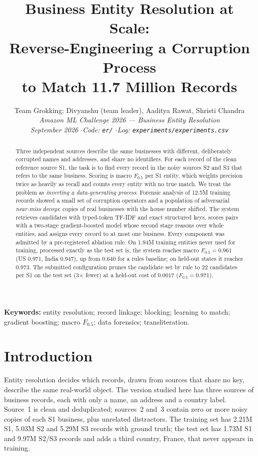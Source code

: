 \documentclass[10pt]{article}
\title{\textbf{Business Entity Resolution at Scale:\\ Reverse-Engineering a Corruption Process\\ to Match 11.7 Million Records}}
\author{Team Grokking: Divyanshu (team leader), Aaditya Rawat, Shristi Chandra\\[2pt]
\small\itshape Amazon ML Challenge 2026 --- Business Entity Resolution\\
\small September 2026 \quad$\cdot$\quad Code: \texttt{er/} \quad$\cdot$\quad Log: \texttt{experiments/experiments.csv}}
\date{}
\newcommand{\Fh}{F_{0.5}}
\begin{document}
\maketitle

\begin{abstract}
\noindent Three independent sources describe the same businesses with different, deliberately corrupted names and addresses, and share no identifiers. For each record of the clean reference source S1, the task is to find every record in the noisy sources S2 and S3 that refers to the same business. Scoring is macro $\Fh$ per S1 entity, which weights precision twice as heavily as recall and counts every entity with no true match. We treat the problem as \emph{inverting a data-generating process}. Forensic analysis of 12.5M training records showed a small set of corruption operators and a population of adversarial \emph{near-miss decoys}: copies of real businesses with the house number shifted. The system retrieves candidates with typed-token TF-IDF and exact structured keys, scores pairs with a two-stage gradient-boosted model whose second stage reasons over whole entities, and assigns every record to at most one business. Every component was admitted by a pre-registered ablation rule. On 1.94M training entities never used for training, processed exactly as the test set is, the system reaches macro $\Fh = 0.961$ (US 0.971, India 0.947), up from 0.640 for a rules baseline; on held-out states it reaches 0.973. The submitted configuration prunes the candidate set by rule to 22 candidates per S1 on the test set (3$\times$ fewer) at a held-out cost of 0.0017 ($\Fh = 0.971$).
\end{abstract}

\noindent\textbf{Keywords:} entity resolution; record linkage; blocking; learning to match; gradient boosting; macro $\Fh$; data forensics; transliteration.

\section{Introduction}

Entity resolution decides which records, drawn from sources that share no key, describe the same real-world object. The version studied here has three sources of business records, each with only a name, an address and a country label. Source~1 is clean and deduplicated; sources~2 and~3 contain zero or more noisy copies of each S1 business, plus unrelated distractors. The training set has 2.21M S1, 5.03M S2 and 5.29M S3 records with ground truth; the test set has 1.73M S1 and 9.97M S2/S3 records and adds a third country, France, that never appears in training.
\end{document}
